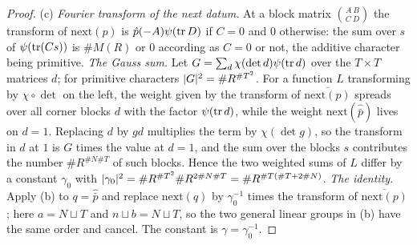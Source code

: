 \begin{proof}
(c) \emph{Fourier transform of the next datum.} At a block matrix $\binom{A\ B}{C\ D}$ the transform of $\mathrm{next}(p)$ is $\hat p(-A)\psi(\operatorname{tr} D)$ if $C=0$ and $0$ otherwise: the sum over $s$ of $\psi(\operatorname{tr}(Cs))$ is
$\#M(R)$ or $0$ according as $C=0$ or not, the additive character being primitive. \emph{The Gauss sum.} Let $G=\sum_d\chi(\det d)\psi(\operatorname{tr} d)$ over the $T\times T$ matrices $d$; for primitive characters
$\lvert G\rvert^2=\#R^{\#T^2}$. For a function $L$ transforming by $\chi\circ\det$ on the left, the weight given by the transform of $\overline{\mathrm{next}(p)}$ spreads over all corner blocks $d$ with the factor $\psi(\operatorname{tr} d)$,
while the weight $\mathrm{next}(\hat{\bar p})$ lives on $d=1$. Replacing $d$ by $gd$ multiplies the term by $\chi(\det g)$, so the transform in $d$ at $1$ is $G$ times the value at $d=1$, and the sum over the blocks
$s$ contributes the number $\#R^{\#N\#T}$ of such blocks. Hence the two weighted sums of $L$ differ by a constant $\gamma_0$ with $\lvert \gamma_0\rvert^2=\#R^{\#T^2}\#R^{2\#N\#T}=\#R^{\#T(\#T+2\#N)}$. \emph{The identity.}
Apply (b) to $q=\hat{\bar p}$ and replace $\mathrm{next}(q)$ by $\gamma_0^{-1}$ times the transform of $\overline{\mathrm{next}(p)}$; here $a=N\sqcup T$ and $n\sqcup b=N\sqcup T$, so the two general linear groups in (b) have the same
order and cancel. The constant is $\gamma=\gamma_0^{-1}$.
\end{proof}

